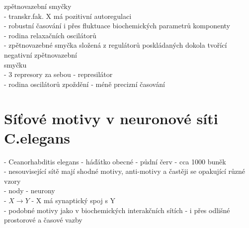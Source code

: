 \documentclass[11pt,a4paper]{report}
\begin{document}
\indent \indent zpětnovazební smyčky\\
\indent \indent - transkr.fak. X má pozitivní autoregulaci\\
\indent \indent \indent - robustní časování i přes fluktuace biochemických parametrů komponenty\\
\indent \indent \indent - rodina relaxačních oscilátorů\\
\indent - zpětnovazebné smyčka složená z regulátorů poskládaných dokola tvořící negativní zpětnovazební\\
\indent \indent smyčku\\
\indent \indent - 3 represory za sebou - represilátor\\
\indent \indent \indent - rodina oscilátorů zpoždění - méně precizní časování\\

\section{Síťové motivy v neuronové síti C.elegans}
- Ceanorhabditis elegans - háďátko obecné - půdní červ - cca 1000 buněk\\
\indent - nesouvisející sítě mají shodné motivy, anti-motivy a častěji se opakující různé vzory\\
- nody - neurony\\
- $X\rightarrow Y$ - X má synaptický spoj s Y\\
- podobné motivy jako v biochemických interakčních sítích - i přes odlišné prostorové a časové vazby\\
\end{document}
